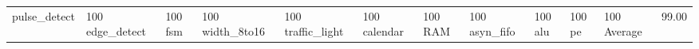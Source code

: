 \begin{tabular}{lllllll}
pulse\_detect & \color{black} {} 100%
edge\_detect & \color{black} {} 100%
fsm & 100%
width\_8to16 & \color{black} {} 100%
traffic\_light & \color{black} {} 100%
calendar & \color{black} {} 100%
RAM & \color{black} {} 100%
asyn\_fifo & 100%
alu & \color{black} {} 100%
pe & \color{black} {} 100%
Average & \color{black} {} 99.00%
\end{tabular}
